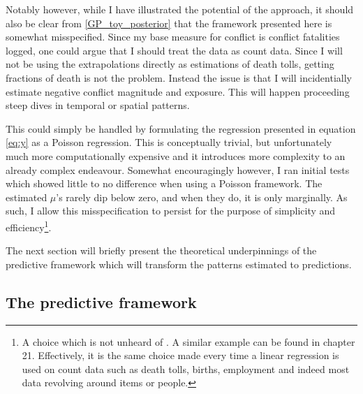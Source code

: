 \documentclass[a4paper]{article}
\begin{document}
Notably however, while I have illustrated the potential of the approach, it should also be clear from \autoref{GP_toy_posterior} that the framework presented here is somewhat misspecified. Since my base measure for conflict is conflict fatalities logged, one could argue that I should treat the data as count data. Since I will not be using the extrapolations directly as estimations of death tolls, getting fractions of death is not the problem. Instead the issue is that I will incidentially estimate negative conflict magnitude and exposure. This will happen proceeding steep dives in temporal or spatial patterns.\par

This could simply be handled by formulating the regression presented in equation \ref{eq:y} as a Poisson regression. This is conceptually trivial, but unfortunately much more computationally expensive and it introduces more complexity to an already complex endeavour. Somewhat encouragingly however, I ran initial tests which showed little to no difference when using a Poisson framework. The estimated $\mu$'s rarely dip below zero, and when they do, it is only marginally. As such, I allow this misspecification to persist for the purpose of simplicity and efficiency\footnote{A choice which is not unheard of  \cite[123]{williams2006gaussian}. A similar example can be found in \cite{Gelman_2013} chapter 21. Effectively, it is the same choice made every time a linear regression is used on count data such as death tolls, births, employment and indeed most data revolving around items or people.}.\par %


The next section will briefly present the theoretical underpinnings of the predictive framework which will transform the patterns estimated to predictions.\par 



\subsection{The predictive framework}
\end{document}
